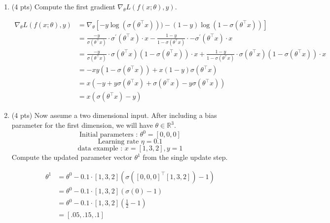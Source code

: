 \documentclass[a4paper]{article}
\theoremstyle{definition}
\newenvironment{soln}{
    \leavevmode\color{blue}\ignorespaces
}{}
\begin{document}
\begin{enumerate}
\begin{enumerate}
	\item (4 pts) Compute the first gradient $\nabla_{\theta} L(f(x;\theta), y)$.
	
	\begin{soln}
		$$
		\begin{aligned}
			\nabla_{\theta} L(f(x;\theta), y) & = \nabla_{\theta} [- y \log(\sigma(\theta^\top x))) - (1 - y) \log(1 - \sigma(\theta^\top x))]\\
			& = \frac{-y}{\sigma(\theta^\top x)} \cdot \sigma^\prime(\theta^\top x) \cdot x - \frac{1-y}{1 - \sigma(\theta^\top x)} \cdot - \sigma^\prime(\theta^\top x) \cdot x\\
			& = \frac{-y}{\sigma(\theta^\top x)} \cdot \sigma(\theta^\top x)(1 - \sigma(\theta^\top x)) \cdot x + \frac{1-y}{1 - \sigma(\theta^\top x)} \cdot \sigma(\theta^\top x)(1 - \sigma(\theta^\top x)) \cdot x\\ 
			& = - xy (1 - \sigma(\theta^\top x)) + x(1-y) \sigma(\theta^\top x)\\
			& = x (-y + y \sigma(\theta^\top x) + \sigma(\theta^\top x) - y \sigma(\theta^\top x))\\
			& = x (\sigma(\theta^\top x) - y)
		\end{aligned}
		$$
	\end{soln}
	
	\item (4 pts)
 Now assume a two dimensional input. After including a bias parameter for the first dimension, we will have $\theta\in\mathbb{R}^3$.
$$ \text{Initial parameters : }  \theta^{0}=[0, 0, 0]$$
$$ \text{Learning rate }\eta=0.1$$
$$ \text{data example : } x=[1, 3, 2], y=1$$
Compute the updated parameter vector $\theta^{1}$ from the single update step.
	
	\begin{soln}
		$$
		\begin{aligned}
			\theta^1 & = \theta^0 - 0.1 \cdot [1, 3, 2] (\sigma([0, 0 , 0]^\top [1, 3, 2]) - 1)\\
			& = \theta^0 - 0.1 \cdot [1, 3, 2] (\sigma(0) - 1)\\ 
			& = \theta^0 - 0.1 \cdot [1, 3, 2] (\frac{1}{2} - 1)\\ 
			& = [.05, .15, .1]
		\end{aligned}
		$$
	\end{soln}
\end{enumerate}
\end{enumerate}
\end{document}

